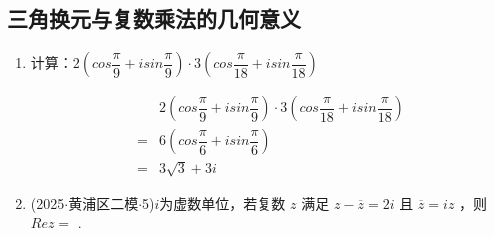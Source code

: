 \subsection*{三角换元与复数乘法的几何意义}
\begin{enumerate}
    \item 计算：$2\left(cos\dfrac{\pi}{9}+isin\dfrac{\pi}{9}\right) \cdot 3\left(cos\dfrac{\pi}{18} + i sin\dfrac{\pi}{18}\right)$
    \begin{jieda}
        \begin{align*}
            & 2\left(cos\dfrac{\pi}{9}+isin\dfrac{\pi}{9}\right) \cdot 3\left(cos\dfrac{\pi}{18} + i sin\dfrac{\pi}{18}\right) \\
            = & 6 \left(cos\dfrac{\pi}{6} + i sin\dfrac{\pi}{6}\right) \\
            = & 3\sqrt{3} + 3i
        \end{align*}
    \end{jieda}
    \item (2025$\cdot$黄浦区二模$\cdot$5)$i$为虚数单位，若复数 $z$ 满足 $z - \overline{z} = 2{i}$ 且 $\overline{z} = {i}z$ ，则 ${Re}z =$ .
\end{enumerate}
